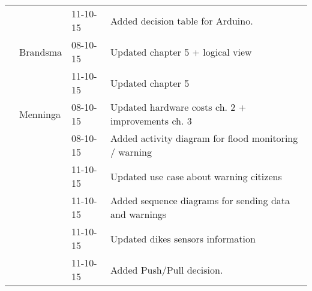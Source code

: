 \begin{longtable}{L{} L{} L{} L{}}
	                 &                       & 11-10-15      & Added decision table for Arduino.                                                                                                                                                                                          \\
	                 & Brandsma              & 08-10-15      & Updated chapter 5 + logical view                                                                                                                                                                                           \\
	                 & 			             & 11-10-15      & Updated chapter 5                                                                                                                                                                                                          \\
					 & Menninga              & 08-10-15      & Updated hardware costs ch. 2 + improvements ch. 3                                                                                                                                                                          \\
	                 &                       & 08-10-15      & Added activity diagram for flood monitoring / warning                                                                                                                                                                      \\
	                 & 			             & 11-10-15      & Updated use case about warning citizens                                                                                                                                                                                    \\
	                 &                       & 11-10-15      & Added sequence diagrams for sending data and warnings                                                                                                                                                                      \\
	                 &                       & 11-10-15      & Updated dikes sensors information                                                                                                                                                                                          \\
	                 & 			             & 11-10-15      & Added Push/Pull decision.                                                                                                                                                                                                  \\
	\midrule
			

\end{longtable}

